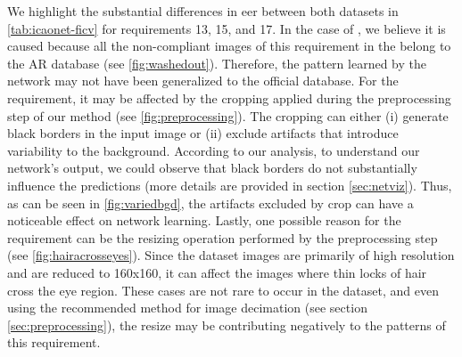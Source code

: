 We highlight the substantial differences in \acs{eer} between both datasets in \autoref{tab:icaonet-ficv} for requirements 13, 15, and 17. In the case of \washedout, we believe it is caused because all the non-compliant images of this requirement in the \ficvtest belong to the AR database (see \autoref{fig:washedout}). Therefore, the pattern learned by the network may not have been generalized to the official database. For the \variedbackground requirement, it may be affected by the cropping applied during the preprocessing step of our method (see \autoref{fig:preprocessing}). The cropping can either (i) generate black borders in the input image or (ii) exclude artifacts that introduce variability to the background. According to our analysis, to understand our network's output, we could observe that black borders do not substantially influence the predictions (more details are provided in section \ref{sec:netviz}). Thus, as can be seen in \autoref{fig:variedbgd}, the artifacts excluded by crop can have a noticeable effect on network learning. Lastly, one possible reason for the \hairacrosseyes requirement can be the resizing operation performed by the preprocessing step (see \autoref{fig:hairacrosseyes}). Since the \adhoc dataset images are primarily of high resolution and are reduced to 160x160, it can affect the images where thin locks of hair cross the eye region. These cases are not rare to occur in the dataset, and even using the recommended method for image decimation (see section \ref{sec:preprocessing}), the resize may be contributing negatively to the patterns of this requirement. 
 
